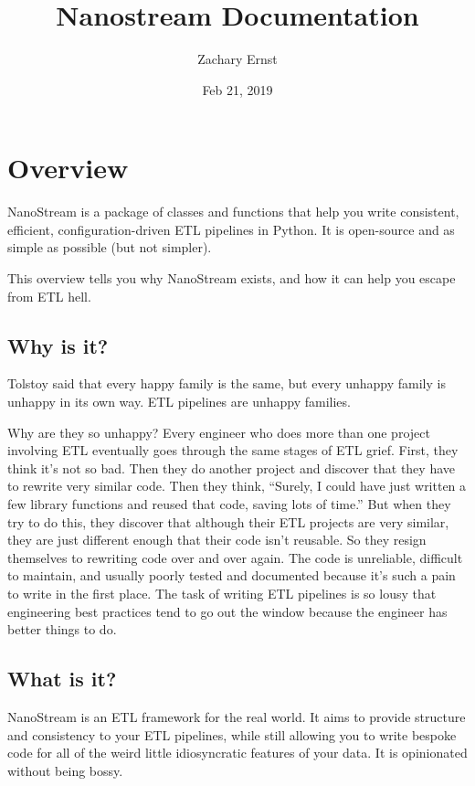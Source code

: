 \documentclass[letterpaper,10pt,english]{sphinxmanual}
\title{Nanostream Documentation}
\date{Feb 21, 2019}
\author{Zachary Ernst}
\begin{document}
\pagestyle{empty}
\maketitle
\pagestyle{plain}
\sphinxtableofcontents
\pagestyle{normal}
\label{\detokenize{index::doc}}



\chapter{Overview}
\label{\detokenize{overview:overview}}\label{\detokenize{overview::doc}}
NanoStream is a package of classes and functions that help you write consistent, efficient, configuration-driven ETL pipelines in Python. It is open-source and
as simple as possible (but not simpler).

This overview tells you why NanoStream exists, and how it can help you escape from ETL hell.


\section{Why is it?}
\label{\detokenize{overview:why-is-it}}
Tolstoy said that every happy family is the same, but every unhappy family is
unhappy in its own way. ETL pipelines are unhappy families.

Why are they so unhappy? Every engineer who does more than one project involving
ETL eventually goes through the same stages of ETL grief. First, they think it’s
not so bad. Then they do another project and discover that they have to rewrite
very similar code. Then they think, “Surely, I could have just written a few
library functions and reused that code, saving lots of time.” But when they try
to do this, they discover that although their ETL projects are very similar,
they are just different enough that their code isn’t reusable. So they resign
themselves to rewriting code over and over again. The code is unreliable,
difficult to maintain, and usually poorly tested and documented because it’s
such a pain to write in the first place. The task of writing ETL pipelines is
so lousy that engineering best practices tend to go out the window because
the engineer has better things to do.


\section{What is it?}
\label{\detokenize{overview:what-is-it}}
NanoStream is an ETL framework for the real world. It aims to provide structure and consistency to your ETL pipelines, while still allowing you to write bespoke code for all of the weird little idiosyncratic features of your data. It is opinionated without being bossy.
\end{document}
